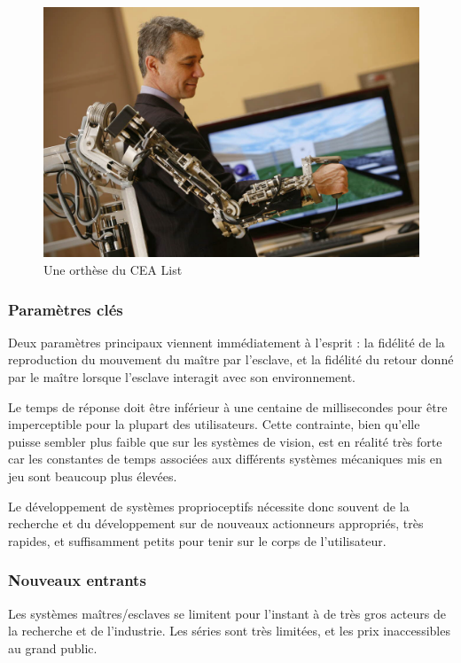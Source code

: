\documentclass[a4,12pt]{scrartcl}
\begin{document}
\begin{figure}[H]
	\centering
	\includegraphics[width=0.6\linewidth]{garrec}
	\caption{Une orthèse du CEA List}
	\label{dexmo}
\end{figure}

\subsubsection{Paramètres clés}

Deux paramètres principaux viennent immédiatement à l'esprit : la fidélité de la reproduction du mouvement du maître par l'esclave, et la fidélité du retour donné par le maître lorsque l'esclave interagit avec son environnement.

Le temps de réponse doit être inférieur à une centaine de millisecondes pour être imperceptible pour la plupart des utilisateurs. Cette contrainte, bien qu'elle puisse sembler plus faible que sur les systèmes de vision, est en réalité très forte car les constantes de temps associées aux différents systèmes mécaniques mis en jeu sont beaucoup plus élevées.

Le développement de systèmes proprioceptifs nécessite donc souvent de la recherche et du développement sur de nouveaux actionneurs appropriés, très rapides, et suffisamment petits pour tenir sur le corps de l'utilisateur.

\subsubsection{Nouveaux entrants}

Les systèmes maîtres/esclaves se limitent pour l'instant à de très gros acteurs de la recherche et de l'industrie. Les séries sont très limitées, et les prix inaccessibles au grand public.
\end{document}
